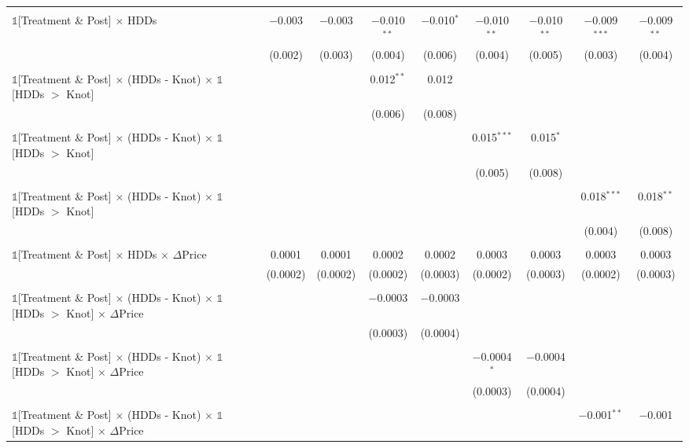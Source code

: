 \begin{table}[!htbp]
\begin{longtable}{@{\extracolsep{0pt}}lcccccccc}
  & & & & & & & & \\ 
 $\mathbb{1}$[Treatment \& Post] $\times$ HDDs & $-$0.003 & $-$0.003 & $-$0.010$^{**}$ & $-$0.010$^{*}$ & $-$0.010$^{**}$ & $-$0.010$^{**}$ & $-$0.009$^{***}$ & $-$0.009$^{**}$ \\ 
  & (0.002) & (0.003) & (0.004) & (0.006) & (0.004) & (0.005) & (0.003) & (0.004) \\ 
  & & & & & & & & \\ 
 $\mathbb{1}$[Treatment \& Post] $\times$ (HDDs - Knot) $\times$ $\mathbb{1}$[HDDs $>$ Knot] &  &  & 0.012$^{**}$ & 0.012 &  &  &  &  \\ 
  &  &  & (0.006) & (0.008) &  &  &  &  \\ 
  & & & & & & & & \\ 
 $\mathbb{1}$[Treatment \& Post] $\times$ (HDDs - Knot) $\times$ $\mathbb{1}$[HDDs $>$ Knot] &  &  &  &  & 0.015$^{***}$ & 0.015$^{*}$ &  &  \\ 
  &  &  &  &  & (0.005) & (0.008) &  &  \\ 
  & & & & & & & & \\ 
 $\mathbb{1}$[Treatment \& Post] $\times$ (HDDs - Knot) $\times$ $\mathbb{1}$[HDDs $>$ Knot] &  &  &  &  &  &  & 0.018$^{***}$ & 0.018$^{**}$ \\ 
  &  &  &  &  &  &  & (0.004) & (0.008) \\ 
  & & & & & & & & \\ 
 $\mathbb{1}$[Treatment \& Post] $\times$ HDDs $\times$ $\Delta$Price & 0.0001 & 0.0001 & 0.0002 & 0.0002 & 0.0003 & 0.0003 & 0.0003 & 0.0003 \\ 
  & (0.0002) & (0.0002) & (0.0002) & (0.0003) & (0.0002) & (0.0003) & (0.0002) & (0.0003) \\ 
  & & & & & & & & \\ 
 $\mathbb{1}$[Treatment \& Post] $\times$ (HDDs - Knot) $\times$ $\mathbb{1}$[HDDs $>$ Knot] $\times$ $\Delta$Price &  &  & $-$0.0003 & $-$0.0003 &  &  &  &  \\ 
  &  &  & (0.0003) & (0.0004) &  &  &  &  \\ 
  & & & & & & & & \\ 
 $\mathbb{1}$[Treatment \& Post] $\times$ (HDDs - Knot) $\times$ $\mathbb{1}$[HDDs $>$ Knot] $\times$ $\Delta$Price &  &  &  &  & $-$0.0004$^{*}$ & $-$0.0004 &  &  \\ 
  &  &  &  &  & (0.0003) & (0.0004) &  &  \\ 
  & & & & & & & & \\ 
 $\mathbb{1}$[Treatment \& Post] $\times$ (HDDs - Knot) $\times$ $\mathbb{1}$[HDDs $>$ Knot] $\times$ $\Delta$Price &  &  &  &  &  &  & $-$0.001$^{**}$ & $-$0.001 \\ 

\end{longtable}
\end{table}
